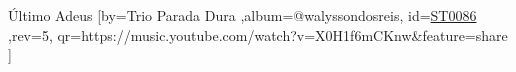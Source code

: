 \beginsong
{Último Adeus %
}[by={Trio Parada Dura %
},album={@walyssondosreis},
id={\href{https://music.youtube.com/watch?v=X0H1f6mCKnw&feature=share %
}{ST0086 %
}},rev={5}, %
qr={https://music.youtube.com/watch?v=X0H1f6mCKnw&feature=share %
}]
\beginverse
